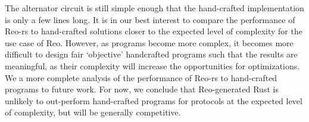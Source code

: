 The alternator circuit is still simple enough that the hand-crafted implementation is only a few lines long. It is in our best interest to compare the performance of Reo-rs to hand-crafted solutions closer to the expected level of complexity for the use case of Reo. However, as programs become more complex, it becomes more difficult to design fair `objective' handcrafted programs such that the results are meaningful, as their complexity will increase the opportunities for optimizations. We a more complete analysis of the performance of Reo-rs to hand-crafted programs to future work. For now, we conclude that Reo-generated Rust is unlikely to out-perform hand-crafted programs for protocols at the expected level of complexity, but will be generally competitive.

\begin{figure}
	\centering
\end{figure}
